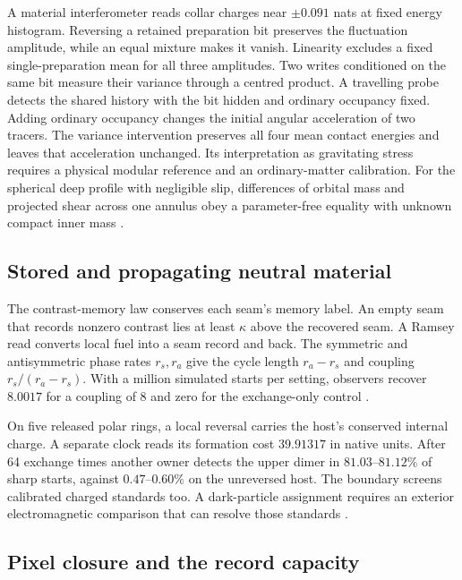 \documentclass[11pt]{article}
\theoremstyle{definition}
\theoremstyle{remark}
\begin{document}
A material interferometer reads collar charges near $\pm0.091$ nats
at fixed energy histogram. Reversing a retained preparation bit preserves
the fluctuation amplitude, while an equal mixture makes it vanish.
Linearity excludes a fixed single-preparation mean for all three
amplitudes. Two writes conditioned on the same bit measure their variance
through a centred product. A travelling probe detects the shared history
with the bit hidden and ordinary occupancy fixed. Adding ordinary
occupancy changes the initial angular acceleration of two tracers.
The variance intervention preserves all four mean contact energies and
leaves that acceleration unchanged. Its interpretation as gravitating
stress requires a physical modular reference and an ordinary-matter
calibration. For the spherical deep profile with negligible slip,
differences of orbital mass and projected shear across one annulus obey
a parameter-free equality with unknown compact inner mass
\cite{ophdarkmatter}.

\subsection{Stored and propagating neutral material}
\label{sec:collar-reading}

The contrast-memory law conserves each seam's memory label. An empty
seam that records nonzero contrast lies at least \(\kappa\) above the
recovered seam. A Ramsey read converts local fuel into a seam record and
back. The symmetric and antisymmetric phase rates \(r_s,r_a\) give the
cycle length \(r_a-r_s\) and coupling \(r_s/(r_a-r_s)\). With a million
simulated starts per setting, observers recover \(8.0017\) for a coupling
of 8 and zero for the exchange-only control \cite{ophmodel}.

On five released polar rings, a local reversal carries the host's
conserved internal charge. A separate clock reads its formation cost
\(39.91317\) in native units. After 64 exchange times another owner
detects the upper dimer in \(81.03\)--\(81.12\%\) of sharp starts, against
\(0.47\)--\(0.60\%\) on the unreversed host. The boundary screens
calibrated charged standards too. A dark-particle assignment requires
an exterior electromagnetic comparison that can resolve those standards
\cite{ophmodel}.

\subsection{Pixel closure and the record capacity}
\label{sec:closure-principle}
\end{document}
